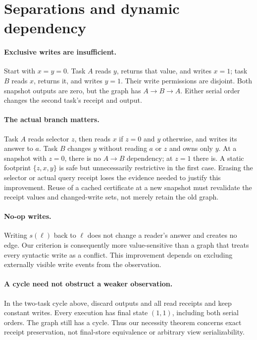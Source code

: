 \documentclass[11pt]{article}
\begin{document}
\section{Separations and dynamic dependency}
\paragraph{Exclusive writes are insufficient.}
Start with $x=y=0$. Task $A$ reads $y$, returns that value, and writes $x=1$; task $B$ reads $x$, returns it, and writes $y=1$. Their write permissions are disjoint. Both snapshot outputs are zero, but the graph has $A\to B\to A$. Either serial order changes the second task's receipt and output.

\paragraph{The actual branch matters.}
Task $A$ reads selector $z$, then reads $x$ if $z=0$ and $y$ otherwise, and writes its answer to $a$. Task $B$ changes $y$ without reading $a$ or $z$ and owns only $y$. At a snapshot with $z=0$, there is no $A\to B$ dependency; at $z=1$ there is. A static footprint $\{z,x,y\}$ is safe but unnecessarily restrictive in the first case. Erasing the selector or actual query receipt loses the evidence needed to justify this improvement. Reuse of a cached certificate at a new snapshot must revalidate the receipt values and changed-write sets, not merely retain the old graph.

\paragraph{No-op writes.}
Writing $s(\ell)$ back to $\ell$ does not change a reader's answer and creates no edge. Our criterion is consequently more value-sensitive than a graph that treats every syntactic write as a conflict. This improvement depends on excluding externally visible write events from the observation.

\paragraph{A cycle need not obstruct a weaker observation.}
In the two-task cycle above, discard outputs and all read receipts and keep constant writes. Every execution has final state $(1,1)$, including both serial orders. The graph still has a cycle. Thus our necessity theorem concerns exact receipt preservation, not final-store equivalence or arbitrary view serializability.
\end{document}
